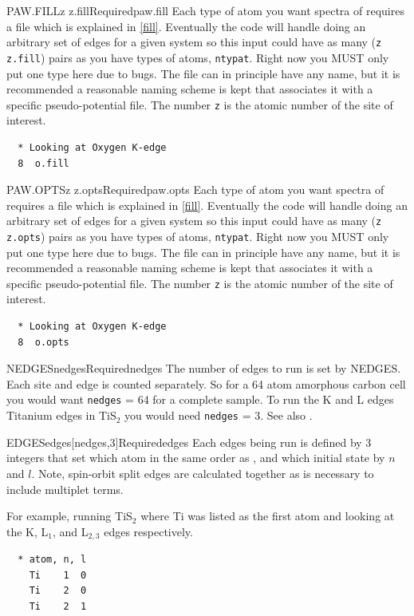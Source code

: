 \documentclass[11pt]{report}
\begin{document}
\begin{Card}{PAW.FILL}{z z.fill}{Required}{paw.fill}
Each type of atom you want spectra of requires a  file which is explained in \ref{fill}. Eventually the code will handle doing an arbitrary set of edges for a given system so this input could have as many (\texttt{z} \texttt{z.fill}) pairs as you have types of atoms, \texttt{ntypat}. Right now you MUST only put one type here due to bugs. The file  can in principle have any name, but it is recommended a reasonable naming scheme is kept that associates it with a specific pseudo-potential file. The number \texttt{z} is the atomic number of the site of interest.

\begin{verbatim}
  * Looking at Oxygen K-edge
  8  o.fill
\end{verbatim}
\end{Card}

\begin{Card}{PAW.OPTS}{z z.opts}{Required}{paw.opts}
Each type of atom you want spectra of requires a  file which is explained in \ref{fill}. Eventually the code will handle doing an arbitrary set of edges for a given system so this input could have as many (\texttt{z} \texttt{z.opts}) pairs as you have types of atoms, \texttt{ntypat}. Right now you MUST only put one type here due to bugs. The file  can in principle have any name, but it is recommended a reasonable naming scheme is kept that associates it with a specific pseudo-potential file. The number \texttt{z} is the atomic number of the site of interest.

\begin{verbatim}
  * Looking at Oxygen K-edge
  8  o.opts
\end{verbatim}
\end{Card}

\begin{Card}{NEDGES}{nedges}{Required}{nedges}
The number of edges to run is set by NEDGES. Each site and edge is counted separately. So for a 64 atom amorphous carbon cell you would want \texttt{nedges} = 64 for a complete sample. To run the K and L edges Titanium edges in TiS$_2$ you would need \texttt{nedges} = 3. See also .
\end{Card}

\begin{Card}{EDGES}{edges[nedges,3]}{Required}{edges}
Each edges being run is defined by 3 integers that set which atom in the same order as , and which initial state by $n$ and $l$. Note, spin-orbit split edges are calculated together as is necessary to include multiplet terms.

For example, running TiS$_2$ where Ti was listed as the first atom and looking at the K, L$_1$, and L$_{2,3}$ edges respectively.
\begin{verbatim}
  * atom, n, l
    Ti    1  0
    Ti    2  0
    Ti    2  1
\end{verbatim}
\end{Card}
\end{document}
